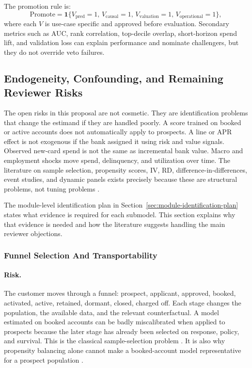 \documentclass[11pt]{article}
\newcommand{\1}{\mathbf{1}}
\begin{document}
The promotion rule is:
\[
  \mathrm{Promote}
  =
  \1\{
    V_{\mathrm{pred}}=1,\,
    V_{\mathrm{causal}}=1,\,
    V_{\mathrm{valuation}}=1,\,
    V_{\mathrm{operational}}=1
  \},
\]
where each $V$ is use-case specific and approved before evaluation. Secondary
metrics such as AUC, rank correlation, top-decile overlap, short-horizon spend
lift, and validation loss can explain performance and nominate challengers,
but they do not override veto failures.

\subsection{Endogeneity, Confounding, and Remaining Reviewer Risks}
\label{sec:reviewer-risks}

The open risks in this proposal are not cosmetic. They are identification
problems that change the estimand if they are handled poorly. A score trained
on booked or active accounts does not automatically apply to prospects. A line
or APR effect is not exogenous if the bank assigned it using risk and value
signals. Observed new-card spend is not the same as incremental bank value.
Macro and employment shocks move spend, delinquency, and utilization over
time. The literature on sample selection, propensity scores, IV, RD,
difference-in-differences, event studies, and dynamic panels exists precisely
because these are structural problems, not tuning problems
\citep{heckman1979selection,rosenbaum1983propensity,angristimbensrubin1996iv,
lee2010rd,callaway2021did,sun2021eventstudy,arellano1991panel,
blundell1998initial,hernanrobins2020causal}.

The module-level identification plan in
Section~\ref{sec:module-identification-plan} states what evidence is required
for each submodel. This section explains why that evidence is needed and how
the literature suggests handling the main reviewer objections.

\subsubsection{Funnel Selection And Transportability}

\paragraph{Risk.}
The customer moves through a funnel: prospect, applicant, approved, booked,
activated, active, retained, dormant, closed, charged off. Each stage changes
the population, the available data, and the relevant counterfactual. A model
estimated on booked accounts can be badly miscalibrated when applied to
prospects because the later stage has already been selected on response,
policy, and survival. This is the classical sample-selection problem
\citep{heckman1979selection}. It is also why propensity balancing alone cannot
make a booked-account model representative for a prospect population
\citep{rosenbaum1983propensity,imbenswooldridge2009recent}.
\end{document}
